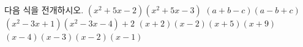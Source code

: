 다음 식을 전개하시오.
 $(x^2+5x-2)(x^2+5x-3)$
 $(a+b-c)(a-b+c)$
 $(x^2-3x+1)(x^2-3x-4)+2$
 $(x+2)(x-2)(x+5)(x+9)$
 $(x-4)(x-3)(x-2)(x-1)$
